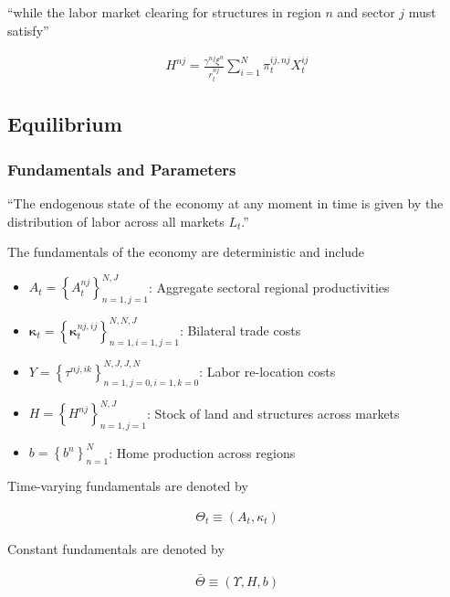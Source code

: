 \documentclass[10pt]{article}
\begin{document}
``while the labor market clearing for structures in region $n$ and sector $j$ must satisfy''


\begin{align}
    H^{n j}=\frac{\gamma^{n j} \xi^n}{r_t^{n j}} \sum_{i=1}^N \pi_t^{i j, n j} X_t^{i j}
\end{align}

\subsection{Equilibrium}

\subsubsection{Fundamentals and Parameters}

``The endogenous state of the economy 
at any moment in time is given by the distribution of labor 
across all markets $L_t$.''

The fundamentals of the economy are deterministic and include 

\begin{itemize}
    \item $A_t=\left\{A_t^{n j}\right\}_{n=1, j=1}^{N, J}$: Aggregate sectoral regional productivities
    \item $\boldsymbol{\kappa}_t=\left\{\boldsymbol{\kappa}_t^{n j, i j}\right\}_{n=1, i=1, j=1}^{N, N, J}$: Bilateral trade costs 
    \item $Y=\left\{\tau^{n j, i k}\right\}_{n=1, j=0, i=1, k=0}^{N, J, J, N}$: Labor re-location costs
    \item $H=\left\{H^{n j}\right\}_{n=1, j=1}^{N, J}$: Stock of land and structures across markets
    \item $b=\left\{b^n\right\}_{n=1}^N$: Home production across regions
\end{itemize}

Time-varying fundamentals are denoted by

\begin{align}
    \Theta_t \equiv\left(A_t, \kappa_t\right)
\end{align}

Constant fundamentals are denoted by

\begin{align}
    \bar{\Theta} \equiv(\Upsilon, H, b)
\end{align}
\end{document}
